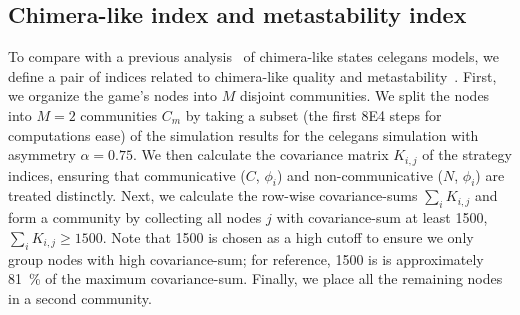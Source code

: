 \documentclass[pdflatex,lineno,referee,sn-nature]{sn-jnl}
\begin{document}
\subsection{Chimera-like index and metastability index}\label{sec:chimera-metastability-def}
To compare with a previous analysis~\citep{hizanidis2016chimera} of
chimera-like states \gls{celegans} models,
we define a pair of indices related to
chimera-like quality and metastability~\citep{shanahan2010metastable}.
First, we organize the game's nodes
into $M$ disjoint communities.
We split the nodes into $M=2$ communities $C_m$
by taking a subset
(the first \num{8E4} steps for computations ease)
of the simulation results
for the \gls{celegans} simulation with asymmetry $\alpha = \num{0.75}$.
We then calculate the covariance matrix $K_{i,j}$ of the strategy indices,
ensuring that communicative ($C$, $\phi_i$)
and non-communicative ($N$, $\phi_i$) are treated distinctly.
Next, we calculate the row-wise covariance-sums  $\sum_i K_{i,j}$
and form a community by collecting all nodes $j$ with covariance-sum
at least \num{1500}, \ie{} $\sum_i K_{i,j} \ge 1500$.
Note that \num{1500} is chosen as a high cutoff
to ensure we only group nodes with high covariance-sum;
for reference, \num{1500} is is approximately \SI{81}{\percent}
of the maximum covariance-sum.
Finally, we place all the remaining nodes in a second community.
\end{document}
